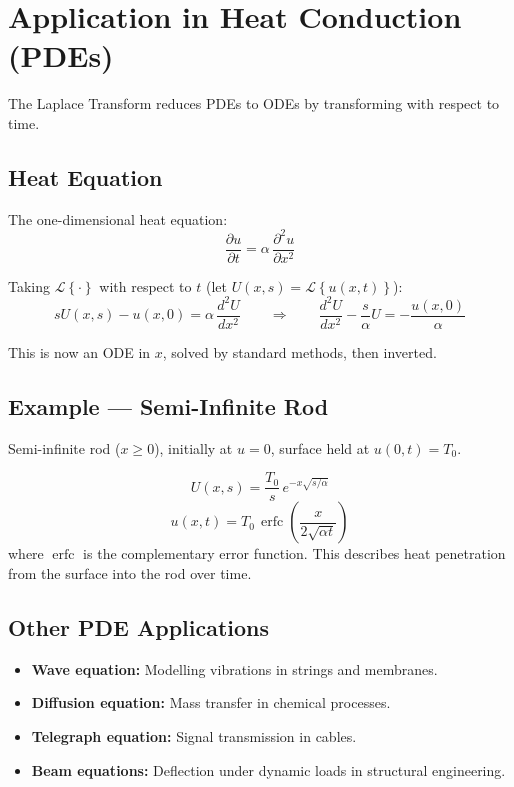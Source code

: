 \documentclass[12pt]{article}
\newcommand{\Lap}[1]{\mathcal{L}\!\left\{#1\right\}}
\begin{document}
\newpage

\section{Application in Heat Conduction (PDEs)}

The Laplace Transform reduces PDEs to ODEs by transforming with respect to time.

\subsection*{Heat Equation}

The one-dimensional heat equation:
\[
  \frac{\partial u}{\partial t} = \alpha\,\frac{\partial^2 u}{\partial x^2}
\]

Taking $\Lap{\cdot}$ with respect to $t$ (let $U(x,s) = \Lap{u(x,t)}$):
\[
  sU(x,s) - u(x,0) = \alpha\,\frac{d^2U}{dx^2}
  \qquad\Longrightarrow\qquad
  \frac{d^2U}{dx^2} - \frac{s}{\alpha}U = -\frac{u(x,0)}{\alpha}
\]

This is now an ODE in $x$, solved by standard methods, then inverted.

\subsection*{Example --- Semi-Infinite Rod}

\begin{examplebox}
Semi-infinite rod ($x \geq 0$), initially at $u=0$, surface held at $u(0,t)=T_0$.

\[
  U(x,s) = \frac{T_0}{s}\,e^{-x\sqrt{s/\alpha}}
\]
\[
  \boxed{u(x,t) = T_0\,\operatorname{erfc}\!\left(\frac{x}{2\sqrt{\alpha t}}\right)}
\]
where $\operatorname{erfc}$ is the complementary error function. This describes heat
penetration from the surface into the rod over time.
\end{examplebox}

\subsection*{Other PDE Applications}

\begin{itemize}[noitemsep]
  \item \textbf{Wave equation:} Modelling vibrations in strings and membranes.
  \item \textbf{Diffusion equation:} Mass transfer in chemical processes.
  \item \textbf{Telegraph equation:} Signal transmission in cables.
  \item \textbf{Beam equations:} Deflection under dynamic loads in structural engineering.
\end{itemize}
\end{document}
